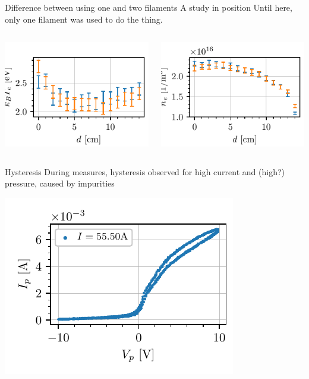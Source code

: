 \documentclass[10pt]{beamer}
\begin{document}
\begin{frame}{Difference between using one and two filaments}
    {A study in position}
    Until here, only one filament was used to do the thing.
    \begin{columns}
        \centering
        \includegraphics[scale=1]{../figures/temperatureeV_position_twofilaments.pdf}

        \centering
        \includegraphics[scale=1]{../figures/density_position_twofilaments.pdf}

    \end{columns}
\end{frame}

\begin{frame}{Hysteresis}
    During measures,
    hysteresis observed for high current and (high?) pressure, caused by impurities

    \includegraphics[scale=1]{../figures/hysteresis.pdf}

\end{frame}
\end{document}
